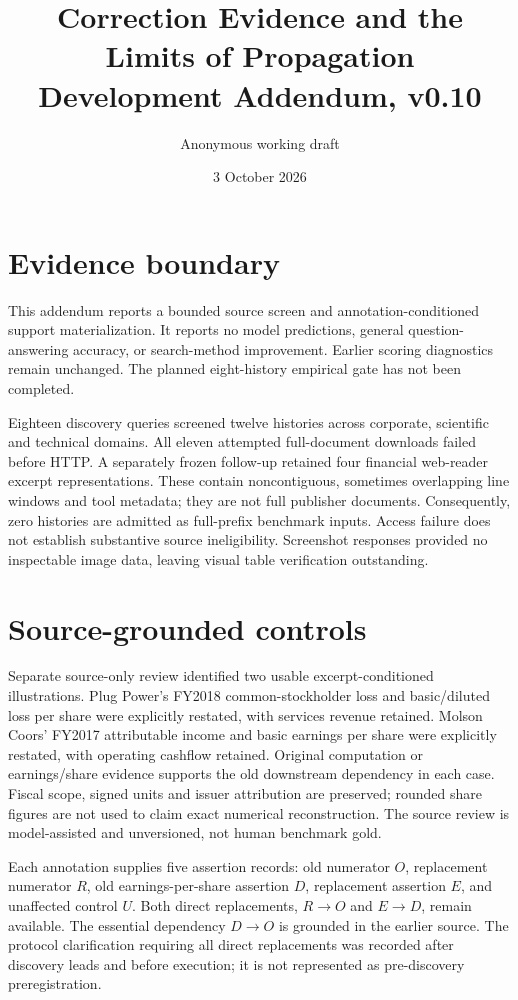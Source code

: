\documentclass[11pt]{article}
\title{Correction Evidence and the Limits of Propagation\\Development Addendum, v0.10}
\author{Anonymous working draft}
\date{3 October 2026}
\begin{document}
\maketitle

\section{Evidence boundary}\label{sec:v10boundary}
This addendum reports a bounded source screen and annotation-conditioned support materialization. It reports no model predictions, general question-answering accuracy, or search-method improvement. Earlier scoring diagnostics remain unchanged. The planned eight-history empirical gate has not been completed.

Eighteen discovery queries screened twelve histories across corporate, scientific and technical domains. All eleven attempted full-document downloads failed before HTTP. A separately frozen follow-up retained four financial web-reader excerpt representations. These contain noncontiguous, sometimes overlapping line windows and tool metadata; they are not full publisher documents. Consequently, zero histories are admitted as full-prefix benchmark inputs. Access failure does not establish substantive source ineligibility. Screenshot responses provided no inspectable image data, leaving visual table verification outstanding.

\section{Source-grounded controls}\label{sec:v10controls}
Separate source-only review identified two usable excerpt-conditioned illustrations. Plug Power's FY2018 common-stockholder loss and basic/diluted loss per share were explicitly restated, with services revenue retained. Molson Coors' FY2017 attributable income and basic earnings per share were explicitly restated, with operating cashflow retained. Original computation or earnings/share evidence supports the old downstream dependency in each case. Fiscal scope, signed units and issuer attribution are preserved; rounded share figures are not used to claim exact numerical reconstruction. The source review is model-assisted and unversioned, not human benchmark gold.

Each annotation supplies five assertion records: old numerator $O$, replacement numerator $R$, old earnings-per-share assertion $D$, replacement assertion $E$, and unaffected control $U$. Both direct replacements, $R\!\to\!O$ and $E\!\to\!D$, remain available. The essential dependency $D\!\to\!O$ is grounded in the earlier source. The protocol clarification requiring all direct replacements was recorded after discovery leads and before execution; it is not represented as pre-discovery preregistration.
\end{document}
